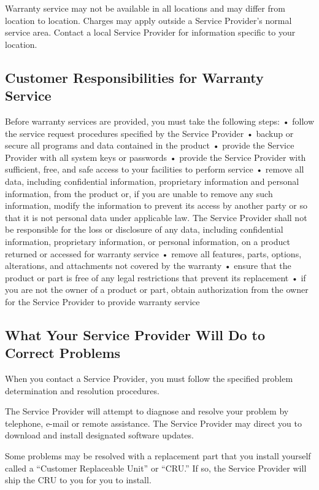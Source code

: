\documentclass[letterpaper,10pt,english]{sphinxmanual}
\begin{document}
Warranty service may not be available in all locations and may differ from location to location. Charges may apply outside a Service Provider’s normal service area. Contact a local Service Provider for information specific to your location.


\subsection{Customer Responsibilities for Warranty Service}
\label{\detokenize{part1:customer-responsibilities-for-warranty-service}}
Before warranty services are provided, you must take the following steps:
• follow the service request procedures specified by the Service Provider
• backup or secure all programs and data contained in the product
• provide the Service Provider with all system keys or passwords
• provide the Service Provider with sufficient, free, and safe access to your facilities to perform service
• remove all data, including confidential information, proprietary information and personal information, from the product or, if you are unable to remove any such information, modify the information to prevent its access by another party or so that it is not personal data under applicable law. The Service Provider shall not be responsible for the loss or disclosure of any data, including confidential information, proprietary information, or personal information, on a product returned or accessed for warranty service
• remove all features, parts, options, alterations, and attachments not covered by the warranty
• ensure that the product or part is free of any legal restrictions that prevent its replacement
• if you are not the owner of a product or part, obtain authorization from the owner for the Service Provider to provide warranty service


\subsection{What Your Service Provider Will Do to Correct Problems}
\label{\detokenize{part1:what-your-service-provider-will-do-to-correct-problems}}
When you contact a Service Provider, you must follow the specified problem determination and resolution procedures.

The Service Provider will attempt to diagnose and resolve your problem by telephone, e-mail or remote assistance. The Service Provider may direct you to download and install designated software updates.

Some problems may be resolved with a replacement part that you install yourself called a “Customer Replaceable Unit” or “CRU.” If so, the Service Provider will ship the CRU to you for you to install.
\end{document}
